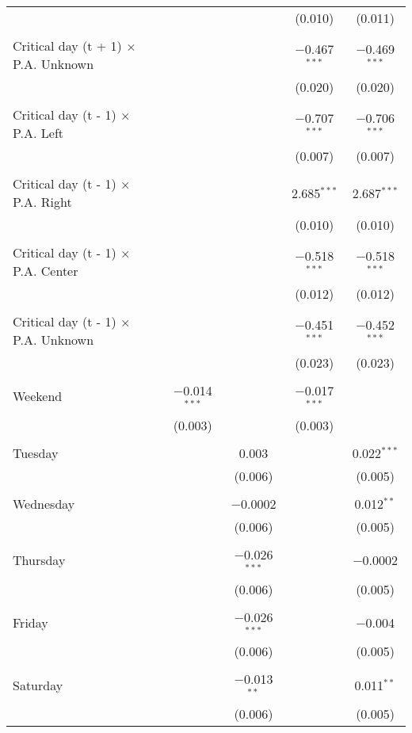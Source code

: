 \documentclass[
]{article}
\begin{document}
\begin{table}[!htbp]
{\begin{tabular}{@{\extracolsep{5pt}}lcccc}
  &  &  & (0.010) & (0.011) \\ 
  & & & & \\ 
 Critical day (t + 1) $\times$ P.A. Unknown &  &  & $-$0.467$^{***}$ & $-$0.469$^{***}$ \\ 
  &  &  & (0.020) & (0.020) \\ 
  & & & & \\ 
 Critical day (t - 1) $\times$ P.A. Left &  &  & $-$0.707$^{***}$ & $-$0.706$^{***}$ \\ 
  &  &  & (0.007) & (0.007) \\ 
  & & & & \\ 
 Critical day (t - 1) $\times$ P.A. Right &  &  & 2.685$^{***}$ & 2.687$^{***}$ \\ 
  &  &  & (0.010) & (0.010) \\ 
  & & & & \\ 
 Critical day (t - 1) $\times$ P.A. Center &  &  & $-$0.518$^{***}$ & $-$0.518$^{***}$ \\ 
  &  &  & (0.012) & (0.012) \\ 
  & & & & \\ 
 Critical day (t - 1) $\times$ P.A. Unknown &  &  & $-$0.451$^{***}$ & $-$0.452$^{***}$ \\ 
  &  &  & (0.023) & (0.023) \\ 
  & & & & \\ 
 Weekend & $-$0.014$^{***}$ &  & $-$0.017$^{***}$ &  \\ 
  & (0.003) &  & (0.003) &  \\ 
  & & & & \\ 
 Tuesday &  & 0.003 &  & 0.022$^{***}$ \\ 
  &  & (0.006) &  & (0.005) \\ 
  & & & & \\ 
 Wednesday &  & $-$0.0002 &  & 0.012$^{**}$ \\ 
  &  & (0.006) &  & (0.005) \\ 
  & & & & \\ 
 Thursday &  & $-$0.026$^{***}$ &  & $-$0.0002 \\ 
  &  & (0.006) &  & (0.005) \\ 
  & & & & \\ 
 Friday &  & $-$0.026$^{***}$ &  & $-$0.004 \\ 
  &  & (0.006) &  & (0.005) \\ 
  & & & & \\ 
 Saturday &  & $-$0.013$^{**}$ &  & 0.011$^{**}$ \\ 
  &  & (0.006) &  & (0.005) \\ 

\end{tabular}}
\end{table}
\end{document}
